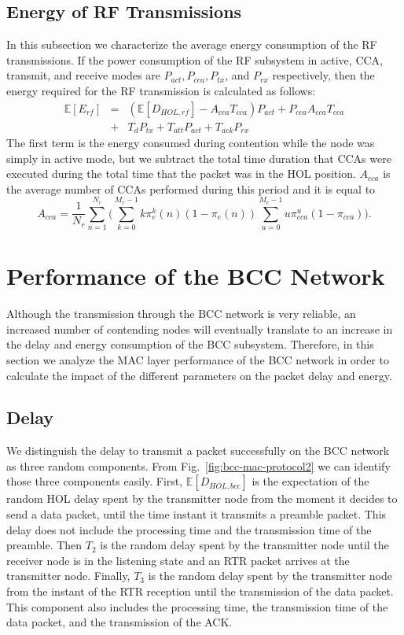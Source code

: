 \documentclass[10pt]{IEEEtran}
\newcounter{section:outage-analysis}
\begin{document}
\subsection{Energy of RF Transmissions}
In this subsection we characterize the average energy consumption of the RF transmissions. If the power consumption of the RF subsystem in active, CCA, transmit, and receive modes are $P_{act},P_{cca},P_{tx}$, and $P_{rx}$ respectively, then the energy required for the RF transmission is calculated as follows:
\begin{eqnarray}\label{E_rf_tot}
    \mathbb{E}[E_{rf}]&=&(\mathbb{E}[D_{HOL,rf}]-A_{cca} T_{cca}) P_{act}+P_{cca} A_{cca} T_{cca}\nonumber\\
        &+&T_{d} P_{tx}+T_{att} P_{act}+T_{ack} P_{rx}
\end{eqnarray}
The first term is the energy consumed during contention while the node was simply in active mode, but we subtract the total time duration that CCAs were executed during the total time that the packet was in the HOL position. $A_{cca}$ is the average number of CCAs performed during this period and it is equal to
\begin{equation}
A_{cca}=\frac{1}{N_r}\sum_{n=1}^{N_r} \big( \sum_{k=0}^{M_r-1} k \pi_e^k(n) (1-\pi_e(n))\sum_{u=0}^{M_c-1} u \pi^u_{cca} (1-\pi_{cca}) \big ).
\end{equation}



\section{Performance of the BCC Network}
\label{section:bcc-model}
Although the transmission through the BCC network is very reliable, an increased number of contending nodes will eventually translate to an increase in the delay and energy consumption of the BCC subsystem. Therefore, in this section we analyze the MAC layer performance of the BCC network in order to calculate the impact of the different parameters on the packet delay and energy.

\subsection{Delay}
We distinguish the delay to transmit a packet successfully on the BCC network as three random components. From Fig.~\ref{fig:bcc-mac-protocol2} we can identify those three components easily. First, $\mathbb{E}[D_{HOL,bcc}]$ is the expectation of the random HOL delay spent by the transmitter node from the moment it decides to send a data packet, until the time instant it transmits a preamble packet. This delay does not include the processing time and the transmission time of the preamble. Then $T_2$ is the random delay spent by the transmitter node until the receiver node is in the listening state and an RTR packet arrives at the transmitter node. Finally, $T_3$ is the random delay spent by the transmitter node from the instant of the RTR reception until the transmission of the data packet. This component also includes the processing time, the transmission time of the data packet, and the transmission of the ACK.
\end{document}
